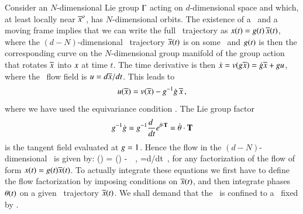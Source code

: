 Consider an $N$-dimensional Lie group $\Gamma$ acting on $d$-dimensional
space and which, at least locally near ${\overline{x}^o}$, has $N$-dimensional orbits.
The existence of a \slice\ and a moving frame implies that we can
write the full \statesp\
trajectory as $x(t)= g(t)\,\overline{x}(t)$, where the
$(d\!-\!N)$-dimensional \reducedsp\ trajectory $\overline{x}(t)$
is on some \slice\, and $g(t)$ is then the
corresponding curve on the $N$-dimensional group manifold of
the group action that rotates $\overline{x}$ into $x$ at time
$t$. The time derivative is then $\dot{x}=
v(g\overline{x}) = \dot{g}\overline{x} + gu$,
where the \reducedsp\ flow field is
$u={d\overline{x}}/{dt}$. This leads to
\[
u(\overline{x}) = v(\overline{x}) - g^{-1} \dot{g} \, \overline{x}
\,,
\]
where we have used the equivariance condition
. The Lie group factor
\[
g^{-1} \dot{g} =
g^{-1}\frac{d~}{dt} e^{{\bf \theta} \cdot \mathbf{T} } =
\dot{{\bf \theta}} \cdot \mathbf{T}
\]
is the tangent field evaluated at ${g} = 1$.
Hence the flow in the
$(d\!-\!N)$-dimensional \reducedsp\ is given by:
\beq
\velRed(\sspRed) = \vel(\sspRed) - \dot{\gSpace} \cdot \Lg \, \sspRed
\,,\qquad
\velRed={d\sspRed}/{dt}
\,,
for any factorization of the flow of form $x(t)=
g(t)\overline{x}(t)$. To actually integrate these equations
we first have to define the flow factorization by imposing
conditions on $\overline{x}(t)$, and then integrate phases
${\bf \theta}(t)$ on a given \reducedsp\ trajectory $\overline{x}(t)$.
We shall demand that the \reducedsp\ is confined to a \slice\
fixed by .

